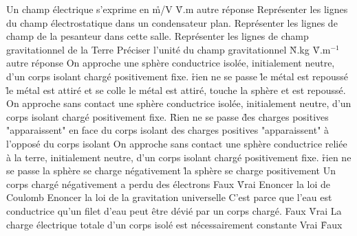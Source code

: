 \q
Un champ électrique s'exprime en 
\r
m/V
\r
V.m
\rv
autre réponse
\q
Représenter les lignes du champ électrostatique dans un condensateur plan.
\q
Représenter les lignes de champ de la pesanteur dans cette salle.
\q
Représenter les lignes de champ gravitationnel de la Terre
\q
Préciser l'unité du champ gravitationnel
\r
N.kg
\r
V.m$^{-1}$
\rv
autre réponse
\q
On approche une sphère conductrice isolée, initialement neutre, d'un corps isolant chargé positivement fixe.
\r
rien ne se passe
\r
le métal est repoussé
\r
le métal est attiré et se colle
\rv
le métal est attiré, touche la sphère et est repoussé.
\q
On approche sans contact une sphère conductrice isolée, initialement neutre, d'un corps isolant chargé positivement fixe.
\r
Rien ne se passe
\r
des charges positives "apparaissent" en face du corps isolant
\rv 
des charges positives "apparaissent" à l'opposé du corps isolant
\q
On approche sans contact une sphère conductrice reliée à la terre, initialement neutre, d'un corps isolant chargé positivement fixe.
\r
rien ne se passe
\rv
la sphère se charge négativement
\r
la sphère se charge positivement
\q
Un corps chargé négativement a perdu des électrons
\rv
Faux
\r
Vrai
\q
Enoncer la loi de Coulomb
\q
Enoncer la loi de la gravitation universelle
\q
C'est parce que l'eau est conductrice qu'un filet d'eau peut être dévié par un corps chargé.
\rv
Faux
\r
Vrai
\q
La charge électrique totale d'un corps isolé est nécessairement constante
\rv
Vrai
\r
Faux


